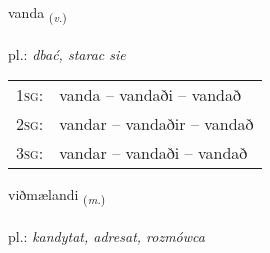 \documentclass[frontgrid, backgrid]{flacards}\usepackage[]{graphicx}\usepackage[]{xcolor}
\begin{document}
\renewcommand{\blhead}{\vskip5pt {\small\bfseries\footnotesize Sagnorð | czasownik }}
\renewcommand{\bcfoot}{\vskip5pt \hspace{2pt}{\small\bfseries\footnotesize 3K}}


{vanda \small{\textsubscript{(\textit{v.})}} \\[1ex] %
\textphonetic{[vanta]} \\
pl.: \emph{dbać, starac sie} \\  [2ex]
\renewcommand*{\arraystretch}{0.8}
\begin{tabular}{p{1cm}l}
\textsc{1sg}: & vanda -- vandaði -- vandað \\ 
\textsc{2sg}: & vandar -- vandaðir -- vandað \\ 
\textsc{3sg}: & vandar -- vandaði -- vandað \\ 
\end{tabular}
}

\renewcommand{\flhead}{\vskip5pt \fboxsep=0pt {\small\bfseries\footnotesize Nafnorð | rzeczownik}}
\renewcommand{\fcfoot}{\vskip5pt \fboxsep=0pt \hspace{2pt}{\small\bfseries\footnotesize 3K}}

\renewcommand{\blhead}{\vskip5pt {\small\bfseries\footnotesize Nafnorð | rzeczownik }}
\renewcommand{\bcfoot}{\vskip5pt \hspace{2pt}{\small\bfseries\footnotesize 3K}}


{viðmælandi \small{\textsubscript{(\textit{m.})}} \\[1ex] %
\textphonetic{[vɪðmailantɪ]} \\
pl.: \emph{kandytat, adresat, rozmówca} \\  [2ex]
\renewcommand*{\arraystretch}{0.8}
}
\end{document}
